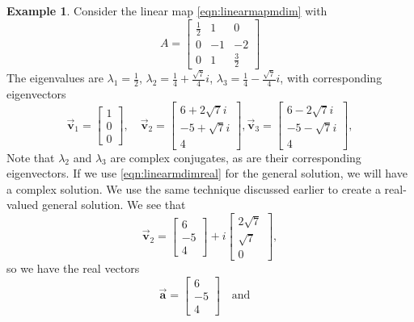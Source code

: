 \documentclass[reqno]{immbook}
\newcommand{\BA}{\vec{\textbf{a}}}
\newcommand{\BV}{\vec{\textbf{v}}}
\numberwithin{equation}{chapter}
\numberwithin{question}{section}
\numberwithin{theorem}{chapter}
\numberwithin{figure}{chapter}
\theoremstyle{definition}
\newtheorem{example}{Example}[section]
\begin{document}
\begin{example}
Consider the linear map \eqref{eqn:linearmapmdim} with
\begin{equation}
   A = \begin{bmatrix}
            \frac{1}{2} &  1  &  0 \\
              0         & -1  & -2 \\
              0         &  1  & \frac{3}{2}
       \end{bmatrix}
\end{equation}
The eigenvalues are
$\lambda_1 = \frac{1}{2}$,
$\lambda_2 = \frac{1}{4} + \frac{\sqrt{7}}{4}i$,
$\lambda_3 = \frac{1}{4} - \frac{\sqrt{7}}{4}i$,
with corresponding eigenvectors
\begin{equation}
  \BV_1 = \begin{bmatrix} 1  \\ 0 \\ 0 \end{bmatrix}, \quad
  \BV_2 = \begin{bmatrix} 6 + 2\sqrt{7}i \\ -5 + \sqrt{7} i \\ 4\end{bmatrix},
  \BV_3 = \begin{bmatrix} 6 - 2\sqrt{7}i \\ -5 - \sqrt{7} i \\ 4\end{bmatrix},
\end{equation}
Note that $\lambda_2$ and $\lambda_3$ are complex conjugates,
as are their corresponding eigenvectors.
If we use \eqref{eqn:linearmdimreal} for the general solution,
we will have a complex solution.  We use the same technique
discussed earlier to create a real-valued general solution.
We see that
\begin{equation}
   \BV_2 = \begin{bmatrix} 6 \\ -5 \\ 4 \end{bmatrix}
           + i \begin{bmatrix} 2\sqrt{7} \\ \sqrt{7} \\ 0\end{bmatrix}, 
\end{equation}
so we have the real vectors
\begin{equation}
    \BA = \begin{bmatrix} 6 \\ -5 \\ 4 \end{bmatrix} \quad \textrm{and} \quad

\end{equation}
\end{example}
\end{document}

